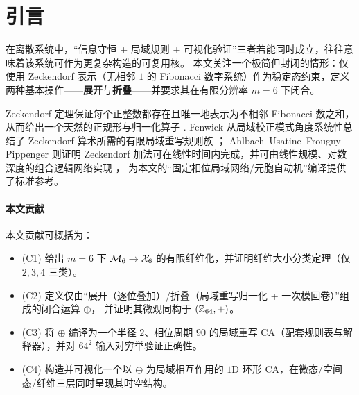 \section{引言}

在离散系统中，“信息守恒 + 局域规则 + 可视化验证”三者若能同时成立，往往意味着该系统可作为更复杂构造的可复用核。
本文关注一个极简但封闭的情形：仅使用 Zeckendorf 表示（无相邻 $1$ 的 Fibonacci 数字系统）作为稳定态约束，定义两种基本操作——\textbf{展开}与\textbf{折叠}——并要求其在有限分辨率 $m=6$ 下闭合。

Zeckendorf 定理保证每个正整数都存在且唯一地表示为不相邻 Fibonacci 数之和，从而给出一个天然的正规形与归一化算子 \cite{WikipediaZeckendorf}.
Fenwick 从局域校正模式角度系统性总结了 Zeckendorf 算术所需的有限局域重写规则族 \cite{Fenwick2003ZeckendorfArithmetic}；
Ahlbach--Usatine--Frougny--Pippenger 则证明 Zeckendorf 加法可在线性时间内完成，并可由线性规模、对数深度的组合逻辑网络实现 \cite{AhlbachEtAl2013ZeckendorfArithmetic}，
为本文的“固定相位局域网络/元胞自动机”编译提供了标准参考。

\paragraph{本文贡献}
本文贡献可概括为：
\begin{itemize}
  \item (C1) 给出 $m=6$ 下 $\mathcal{M}_6\to\mathcal{X}_6$ 的有限纤维化，并证明纤维大小分类定理（仅 $2,3,4$ 三类）。
  \item (C2) 定义仅由“展开（逐位叠加）/折叠（局域重写归一化 + 一次模回卷）”组成的闭合运算 $\oplus$，
  并证明其微观同构于 $(\mathbb{Z}_{64},+)$。
  \item (C3) 将 $\oplus$ 编译为一个半径 $2$、相位周期 $90$ 的局域重写 CA（配套规则表与解释器），并对 $64^2$ 输入对穷举验证正确性。
  \item (C4) 构造并可视化一个以 $\oplus$ 为局域相互作用的 $1$D 环形 CA，在微态/空间态/纤维三层同时呈现其时空结构。
\end{itemize}

